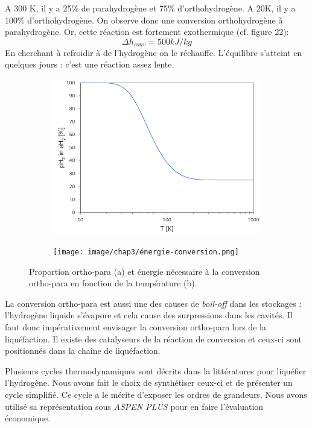 \documentclass[11pt,french,a4paper]{article}
\begin{document}
A 300 K, il y a 25\% de parahydrogène et 75\% d'orthohydrogène. A 20K, il y a 100\% d'orthohydrogène. On observe donc une conversion orthohydrogène à parahydrogène. Or, cette réaction est fortement exothermique (cf. figure 22): 
 $$ \Delta h _{conv} = 500kJ/kg$$
En cherchant à refroidir à de l'hydrogène on le réchauffe. L'équilibre s'atteint en quelques jours : c'est une réaction assez lente.

\begin{figure}[h]
  \centering
  \begin{subfigure}[b]{0.4\linewidth}
    \includegraphics[width=\linewidth]{image/chap3/proportion_o-p.png}
    \caption{ }
  \end{subfigure}
  \hspace{0.1cm}
  \begin{subfigure}[b]{0.4\linewidth}
    \texttt{[image: image/chap3/énergie-conversion.png]}
    \caption{ }
  \end{subfigure}
  \caption{Proportion ortho-para (a) et énergie nécessaire à la conversion ortho-para en fonction de la température (b).}
\end{figure}

La conversion ortho-para est aussi une des causes de \emph{boil-off} dans les stockages : l'hydrogène liquide s'évapore et cela cause des surpressions dans les cavités. Il faut donc impérativement envisager la conversion ortho-para lors de la liquéfaction. Il existe des catalyseurs de la réaction de conversion et ceux-ci sont positionnés dans la chaîne de liquéfaction. 

Plusieurs cycles thermodynamiques sont décrits dans la littératures pour liquéfier l'hydrogène. Nous avons fait le choix de synthétiser ceux-ci et de présenter un cycle simplifié. Ce cycle a le mérite d'exposer les ordres de grandeurs. Nous avons utilisé sa représentation sous \emph{ASPEN PLUS} pour en faire l'évaluation économique.
\end{document}
